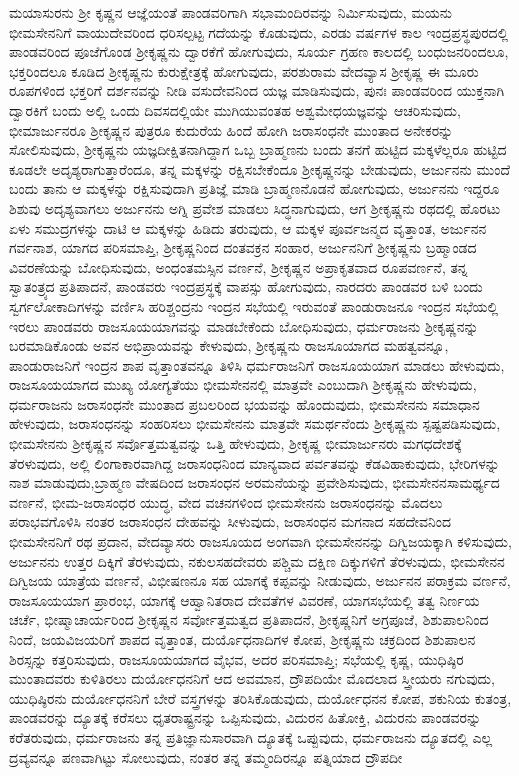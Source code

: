 ಮಯಾಸುರನು ಶ‍್ರೀ ಕೃಷ್ಣನ ಆಜ್ಞೆಯಂತೆ ಪಾಂಡವರಿಗಾಗಿ ಸಭಾಮಂದಿರವನ್ನು ನಿರ್ಮಿಸುವುದು, ಮಯನು ಭೀಮಸೇನನಿಗೆ ವಾಯುದೇವರಿಂದ ಧರಿಸಲ್ಪಟ್ಟ ಗದೆಯನ್ನು ಕೊಡುವುದು, ಎರಡು ವರ್ಷಗಳ ಕಾಲ ಇಂದ್ರಪ್ರಸ್ಥಪುರದಲ್ಲಿ ಪಾಂಡವರಿಂದ ಪೂಜೆಗೊಂಡ ಶ‍್ರೀಕೃಷ್ಣನು ದ್ವಾರಕೆಗೆ ಹೋಗುವುದು, ಸೂರ್ಯ ಗ್ರಹಣ ಕಾಲದಲ್ಲಿ ಬಂಧುಜನರಿಂದಲೂ, ಭಕ್ತರಿಂದಲೂ ಕೂಡಿದ ಶ‍್ರೀಕೃಷ್ಣನು ಕುರುಕ್ಷೇತ್ರಕ್ಕೆ ಹೋಗುವುದು, ಪರಶುರಾಮ ವೇದವ್ಯಾಸ ಶ‍್ರೀಕೃಷ್ಣ ಈ ಮೂರು ರೂಪಗಳಿಂದ ಭಕ್ತರಿಗೆ ದರ್ಶನವನ್ನು ನೀಡಿ ವಸುದೇವನಿಂದ ಯಜ್ಞ ಮಾಡಿಸುವುದು, ಪುನಃ ಪಾಂಡವರಿಂದ ಯುಕ್ತನಾಗಿ ದ್ವಾರಕಿಗೆ ಬಂದು ಅಲ್ಲಿ ಒಂದು ದಿವಸದಲ್ಲಿಯೇ ಮುಗಿಯುವಂತಹ ಅಶ್ವಮೇಧಯಜ್ಞವನ್ನು ಆಚರಿಸುವುದು, ಭೀಮಾರ್ಜುನರೂ ಶ‍್ರೀಕೃಷ್ಣನ ಪುತ್ರರೂ ಕುದುರೆಯ ಹಿಂದೆ ಹೋಗಿ ಜರಾಸಂಧನೇ ಮುಂತಾದ ಅನೇಕರನ್ನು ಸೋಲಿಸುವುದು, ಶ‍್ರೀಕೃಷ್ಣನು ಯಜ್ಞದೀಕ್ಷಿತನಾಗಿದ್ದಾಗ ಒಬ್ಬ ಬ್ರಾಹ್ಮಣನು ಬಂದು ತನಗೆ ಹುಟ್ಟಿದ ಮಕ್ಕಳೆಲ್ಲರೂ ಹುಟ್ಟಿದ ಕೂಡಲೇ ಅದೃಶ್ಯರಾಗುತ್ತಾರೆಂದೂ, ತನ್ನ ಮಕ್ಕಳನ್ನು ರಕ್ಷಿಸಬೇಕೆಂದೂ ಶ‍್ರೀಕೃಷ್ಣನನ್ನು ಬೇಡುವುದು, ಅರ್ಜುನನು ಮುಂದೆ ಬಂದು ತಾನು ಆ ಮಕ್ಕಳನ್ನು ರಕ್ಷಿಸುವುದಾಗಿ ಪ್ರತಿಜ್ಞೆ ಮಾಡಿ ಬ್ರಾಹ್ಮಣನೊಡನೆ ಹೋಗುವುದು, ಅರ್ಜುನನು ಇದ್ದರೂ ಶಿಶುವು ಅದೃಶ್ಯವಾಗಲು ಅರ್ಜುನನು ಅಗ್ನಿ ಪ್ರವೇಶ ಮಾಡಲು ಸಿದ್ಧನಾಗುವುದು, ಆಗ ಶ‍್ರೀಕೃಷ್ಣನು ರಥದಲ್ಲಿ ಹೊರಟು ಏಳು ಸಮುದ್ರಗಳನ್ನು ದಾಟಿ ಆ ಮಕ್ಕಳನ್ನು ಹಿಡಿದು ತರುವುದು, ಆ ಮಕ್ಕಳ ಪೂರ್ವಜನ್ಮದ ವೃತ್ತಾಂತ, ಅರ್ಜುನನ ಗರ್ವನಾಶ, ಯಾಗದ ಪರಿಸಮಾಪ್ತಿ, ಶ‍್ರೀಕೃಷ್ಣನಿಂದ ದಂತವಕ್ರನ ಸಂಹಾರ, ಅರ್ಜುನನಿಗೆ ಶ‍್ರೀಕೃಷ್ಣನು ಬ್ರಹ್ಮಾಂಡದ ವಿವರಣೆಯನ್ನು ಬೋಧಿಸುವುದು, ಅಂಧಂತಮಸ್ಸಿನ ವರ್ಣನೆ, ಶ‍್ರೀಕೃಷ್ಣನ ಅಪ್ರಾಕೃತವಾದ ರೂಪವರ್ಣನೆ, ತನ್ನ ಸ್ವಾತಂತ್ರ್ಯದ ಪ್ರತಿಪಾದನೆ, ಪಾಂಡವರು ಇಂದ್ರಪ್ರಸ್ಥಕ್ಕೆ ವಾಪಸ್ಸು ಹೋಗುವುದು, ನಾರದರು ಪಾಂಡವರ ಬಳಿ ಬಂದು ಸ್ವರ್ಗಲೋಕಾದಿಗಳನ್ನು ವರ್ಣಿಸಿ ಹರಿಶ್ಚಂದ್ರನು ಇಂದ್ರನ ಸಭೆಯಲ್ಲಿ ಇರುವಂತೆ ಪಾಂಡುರಾಜನೂ ಇಂದ್ರನ ಸಭೆಯಲ್ಲಿ ಇರಲು ಪಾಂಡವರು ರಾಜಸೂಯಯಾಗವನ್ನು ಮಾಡಬೇಕೆಂದು ಬೋಧಿಸುವುದು, ಧರ್ಮರಾಜನು ಶ‍್ರೀಕೃಷ್ಣನನ್ನು ಬರಮಾಡಿಕೊಂಡು ಅವನ ಅಭಿಪ್ರಾಯವನ್ನು ಕೇಳುವುದು, ಶ‍್ರೀಕೃಷ್ಣನು ರಾಜಸೂಯಾಗದ ಮಹತ್ವವನ್ನೂ, ಪಾಂಡುರಾಜನಿಗೆ ಇಂದ್ರನ ಶಾಪ ವೃತ್ತಾಂತವನ್ನೂ ತಿಳಿಸಿ ಧರ್ಮರಾಜನಿಗೆ ರಾಜಸೂಯಯಾಗ ಮಾಡಲು ಹೇಳುವುದು, ರಾಜಸೂಯಯಾಗದ ಮುಖ್ಯ ಯೋಗ್ಯತೆಯು ಭೀಮಸೇನನಲ್ಲಿ ಮಾತ್ರವೇ ಎಂಬುದಾಗಿ ಶ‍್ರೀಕೃಷ್ಣನು ಹೇಳುವುದು, ಧರ್ಮರಾಜನು ಜರಾಸಂಧನೇ ಮುಂತಾದ ಪ್ರಬಲರಿಂದ ಭಯವನ್ನು ಹೊಂದುವುದು, ಭೀಮಸೇನನು ಸಮಾಧಾನ ಹೇಳುವುದು, ಜರಾಸಂಧನನ್ನು ಸಂಹರಿಸಲು ಭೀಮಸೇನನು ಮಾತ್ರವೇ ಸಮರ್ಥನೆಂದು ಶ‍್ರೀಕೃಷ್ಣನು ಸ್ಪಷ್ಟಪಡಿಸುವುದು, ಭೀಮಸೇನನು ಶ‍್ರೀಕೃಷ್ಣನ ಸರ್ವೊತ್ತಮತ್ವವನ್ನು ಒತ್ತಿ ಹೇಳುವುದು, ಶ‍್ರೀಕೃಷ್ಣ ಭೀಮಾರ್ಜುನರು ಮಗಧದೇಶಕ್ಕೆ ತೆರಳುವುದು, ಅಲ್ಲಿ ಲಿಂಗಾಕಾರವಾಗಿದ್ದ ಜರಾಸಂಧನಿಂದ ಮಾನ್ಯವಾದ ಪರ್ವತವನ್ನು ಕೆಡವಿಹಾಕುವುದು, ಭೇರಿಗಳನ್ನು ನಾಶ ಮಾಡುವುದು,\break ಬ್ರಾಹ್ಮಣ ವೇಷದಿಂದ ಜರಾಸಂಧನ ಅರಮನೆಯನ್ನು ಪ್ರವೇಶಿಸುವುದು, ಭೀಮಸೇನನ\break ಸಾಮರ್ಥ್ಯದ ವರ್ಣನೆ, ಭೀಮ-ಜರಾಸಂಧರ ಯುದ್ಧ, ವೇದ ವಚನಗಳಿಂದ ಭೀಮಸೇನನು ಜರಾಸಂಧನನ್ನು ಮೊದಲು ಪರಾಭವಗೊಳಿಸಿ ನಂತರ ಜರಾಸಂಧನ ದೇಹವನ್ನು ಸೀಳುವುದು, ಜರಾಸಂಧನ ಮಗನಾದ ಸಹದೇವನಿಂದ ಭೀಮಸೇನನಿಗೆ ರಥ ಪ್ರದಾನ, ವೇದವ್ಯಾಸರು ರಾಜಸೂಯದ ಅಂಗವಾಗಿ ಭೀಮಸೇನನನ್ನು ದಿಗ್ವಿಜಯಕ್ಕಾಗಿ ಕಳಿಸುವುದು, ಅರ್ಜುನನು ಉತ್ತರ ದಿಕ್ಕಿಗೆ ತೆರಳುವುದು, ನಕುಲಸಹದೇವರು ಪಶ್ಚಿಮ ದಕ್ಷಿಣ ದಿಕ್ಕುಗಳಿಗೆ ತೆರಳುವುದು, ಭೀಮಸೇನನ ದಿಗ್ವಿಜಯ ಯಾತ್ರೆಯ ವರ್ಣನೆ, ವಿಭೀಷಣನೂ ಸಹ ಯಾಗಕ್ಕೆ ಕಪ್ಪವನ್ನು ನೀಡುವುದು, ಅರ್ಜುನನ ಪರಾಕ್ರಮ ವರ್ಣನೆ, ರಾಜಸೂಯಯಾಗ ಪ್ರಾರಂಭ, ಯಾಗಕ್ಕೆ ಆಹ್ವಾನಿತರಾದ ದೇವತೆಗಳ ವಿವರಣೆ, ಯಾಗಸಭೆಯಲ್ಲಿ ತತ್ವ ನಿರ್ಣಯ ಚರ್ಚೆ, ಭೀಷ್ಮಾಚಾರ್ಯರಿಂದ ಶ‍್ರೀಕೃಷ್ಣನ ಸರ್ವೋತ್ತಮತ್ವದ ಪ್ರತಿಪಾದನೆ, ಶ‍್ರೀಕೃಷ್ಣನಿಗೆ ಅಗ್ರಪೂಜೆ, ಶಿಶುಪಾಲನಿಂದ ನಿಂದೆ, ಜಯವಿಜಯರಿಗೆ ಶಾಪದ ವೃತ್ತಾಂತ, ದುರ್ಯೊಧನಾದಿಗಳ ಕೋಪ, ಶ‍್ರೀಕೃಷ್ಣನು ಚಕ್ರದಿಂದ ಶಿಶುಪಾಲನ ಶಿರಸ್ಸನ್ನು ಕತ್ತರಿಸುವುದು, ರಾಜಸೂಯ\-ಯಾಗದ ವೈಭವ, ಅದರ ಪರಿಸಮಾಪ್ತಿ; ಸಭೆಯಲ್ಲಿ ಕೃಷ್ಣ, ಯುಧಿಷ್ಠಿರ ಮುಂತಾದವರು ಕುಳಿತಿರಲು ದುರ್ಯೋಧನನಿಗೆ ಆದ ಅವಮಾನ, ದ್ರೌಪದಿಯೇ ಮೊದಲಾದ ಸ್ತ್ರೀಯರು ನಗುವುದು, ಯುಧಿಷ್ಠಿರನು ದುರ್ಯೋಧನನಿಗೆ ಬೇರೆ ವಸ್ತ್ರಗಳನ್ನು ತರಿಸಿಕೊಡುವುದು, ದುರ್ಯೋಧನನ ಕೋಪ, ಶಕುನಿಯ ಕುತಂತ್ರ, ಪಾಂಡವರನ್ನು ದ್ಯೂತಕ್ಕೆ ಕರೆಸಲು ಧೃತರಾಷ್ಟ್ರನನ್ನು ಒಪ್ಪಿಸುವುದು, ವಿದುರನ ಹಿತೋಕ್ತಿ, ವಿದುರನು ಪಾಂಡವರನ್ನು ಕರೆತರುವುದು, ಧರ್ಮರಾಜನು ತನ್ನ ಪ್ರತಿಜ್ಞಾನುಸಾರವಾಗಿ ದ್ಯೂತಕ್ಕೆ ಒಪ್ಪುವುದು, ಧರ್ಮರಾಜನು ದ್ಯೂತದಲ್ಲಿ ಎಲ್ಲ ದ್ರವ್ಯವನ್ನೂ ಪಣವಾಗಿಟ್ಟು ಸೋಲುವುದು, ನಂತರ ತನ್ನ ತಮ್ಮಂದಿರನ್ನೂ ಪತ್ನಿಯಾದ ದ್ರೌಪದೀ 